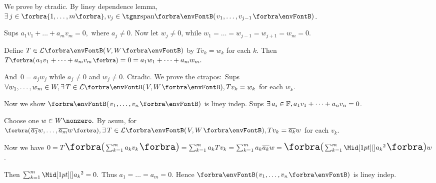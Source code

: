 \par\quad
We prove by ctradic. By liney dependence lemma, $\exists\,j\in\Bra{1,\dots,m},v_j\in\Span{v_1,\dots,v_{j-1}}$.\par\quad
Sups $a_1 v_1+\dots+a_m v_m=0,$ where $a_j\neq 0.$ \;Now let $w_j\neq 0$, while $w_1=\dots=w_{j-1}=w_{j+1}=w_m=0.$\par\quad
Define $T\in\Lm{V,W}$ by $Tv_k=w_k$ for each $k.$ Then $T\BigPar{a_1 v_1+\dots+a_m v_m}=0=a_1 w_1+\dots+a_m w_m.$\par\quad
And \,$0=a_j w_j$ while $a_j\neq 0$ and $w_j\neq 0.$ Ctradic.\PfEnd\vspace{6pt}\quad
\Or We prove the ctrapos\hspace{1pt}: \,Sups $\forall w_1,\dots,w_m\in W,\exists\,T\in\Lm{V,W},Tv_k=w_k$  for each $w_k.$\par\quad
{Now we show $\Par{v_1,\dots,v_n}$ is liney indep. Sups {$\exists\,a_i\in{\mathbb{F}},a_1 v_1+\dots+a_n v_n=0$}.}\vspace{2pt}\par\quad
{Choose one $w\in W\nonzero.$ By asum, for {$\BigPar{\overline{a_1}w,\dots,\overline{a_m}w},\exists\,T\in\Lm{V,W},Tv_k=\overline{a_k}w$} for each $v_k$.}\vspace{2pt}\par\quad
{Now we have {$ 0=T\envFontLarge\BigPar{{\envFontDefault\sum_{k=1}^m a_k v_k}}=\sum_{k=1}^m a_k Tv_k=\sum_{k=1}^m a_k\overline{a_k}w=\BigPar{{\envFontDefault\sum_{k=1}^m \aMid{a_k}{^2}}}w$}.}\vspace{2pt}\par\quad
{Then {$\sum_{k=1}^m\aMid{a_k}{^2}=0.$ Thus $a_1=\dots=a_m=0.$} Hence $\Par{v_1,\dots,v_n}$ is liney indep.}\PfEnd
\SepLine

